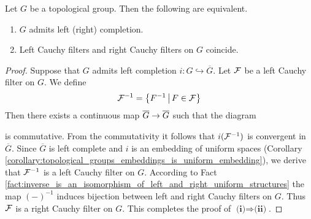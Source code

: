 \documentclass[10pt]{amsart}
\begin{document}
\begin{theorem}\label{theorem:criterion_for_existence_of_one_sided_completions}
	Let $G$ be a topological group. Then the following are equivalent.
	\begin{enumerate}[label=\emph{\textbf{(\roman*)}}, leftmargin=*]
		\item $G$ admits left (right) completion.
		\item Left Cauchy filters and right Cauchy filters on $G$ coincide.
	\end{enumerate}
\end{theorem}
\begin{proof}
	Suppose that $G$ admits left completion $i:G \hookrightarrow \overline{G}$. Let ${\mathcal F}$ be a left Cauchy filter on $G$. We define
	$${\mathcal F}^{-1} = \big\{F^{-1}\,\big|\,F\in {\mathcal F}\big\}$$
	Then there exists a continuous map $\overline{G}\rightarrow \overline{G}$ such that the diagram
	\begin{center}
	\end{center}
	is commutative. From the commutativity it follows that $i({\mathcal F}^{-1})$ is convergent in $\overline{G}$. Since $\overline{G}$ is left complete and $i$ is an embedding of uniform spaces (Corollary \ref{corollary:topological_groups_embeddings_is_uniform_embedding}), we derive that ${\mathcal F}^{-1}$ is a left Cauchy filter on $G$. According to Fact \ref{fact:inverse_is_an_isomorphism_of_left_and_right_uniform_structures} the map $(-)^{-1}$ induces bijection between left and right Cauchy filters on $G$. Thus ${\mathcal F}$ is a right Cauchy filter on $G$. This completes the proof of $\textbf{(i)}\Rightarrow \textbf{(ii)}$.


\end{proof}



























\small


\end{document}
